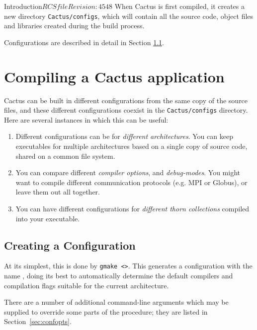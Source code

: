 \begin{cactuspart}{Introduction}{$RCSfile$}{$Revision: 4548 $}
When Cactus is first compiled, it creates a new directory
\texttt{Cactus/configs}, which will contain all the source code, object files
and libraries created during the build process.

Configurations are described in detail in Section \ref{sec:configurations}.


\section{Compiling a Cactus application}



Cactus can be built in different configurations from the same copy of
the source files, and these different configurations coexist in the
\texttt{Cactus/configs} directory. Here are several instances in which
 this can be useful:

\begin{enumerate}
\item{}Different configurations can be for \emph{different
architectures}. You can keep executables for multiple architectures
based on a single copy of source code, shared on a common file
system.
\item{} You can compare different \textit{compiler options}, and \textit{debug-modes}.
  You might want to compile different communication protocols
  (e.g. MPI or Globus), or leave them out all together.
\item{} You can have different configurations for \textit{different thorn
    collections} compiled into your executable.
\end{enumerate}

\subsection{Creating a Configuration}
\label{sec:configurations}

At its simplest, this is done by \texttt{gmake <>}.
This generates a
configuration with the name \texttt{}, doing its best to
automatically determine the default compilers and compilation flags
suitable for the current architecture.

There are a number of additional command-line arguments which may be supplied
to override some parts of the procedure; they are listed in Section~\ref{sec:confopts}.


\end{cactuspart}
